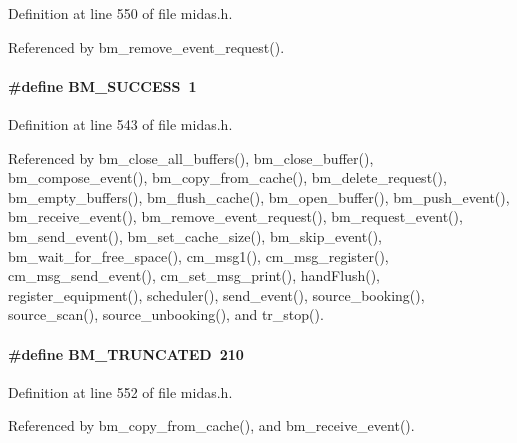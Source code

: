 \begin{DoxyItemize}
\item 
\end{DoxyItemize}

Definition at line 550 of file midas.h.

Referenced by bm\_\-remove\_\-event\_\-request().
\paragraph[{BM\_\-SUCCESS}]{\setlength{\rightskip}{0pt plus 5cm}\#define BM\_\-SUCCESS~1}\hfill\label{group__err22_gadccfb762fd84f9e33940f3d1204042b0}

\begin{DoxyItemize}
\item 
\end{DoxyItemize}

Definition at line 543 of file midas.h.

Referenced by bm\_\-close\_\-all\_\-buffers(), bm\_\-close\_\-buffer(), bm\_\-compose\_\-event(), bm\_\-copy\_\-from\_\-cache(), bm\_\-delete\_\-request(), bm\_\-empty\_\-buffers(), bm\_\-flush\_\-cache(), bm\_\-open\_\-buffer(), bm\_\-push\_\-event(), bm\_\-receive\_\-event(), bm\_\-remove\_\-event\_\-request(), bm\_\-request\_\-event(), bm\_\-send\_\-event(), bm\_\-set\_\-cache\_\-size(), bm\_\-skip\_\-event(), bm\_\-wait\_\-for\_\-free\_\-space(), cm\_\-msg1(), cm\_\-msg\_\-register(), cm\_\-msg\_\-send\_\-event(), cm\_\-set\_\-msg\_\-print(), handFlush(), register\_\-equipment(), scheduler(), send\_\-event(), source\_\-booking(), source\_\-scan(), source\_\-unbooking(), and tr\_\-stop().
\paragraph[{BM\_\-TRUNCATED}]{\setlength{\rightskip}{0pt plus 5cm}\#define BM\_\-TRUNCATED~210}\hfill\label{group__err22_ga21752d578978d7ffe3cdd82e28936667}

\begin{DoxyItemize}
\item 
\end{DoxyItemize}

Definition at line 552 of file midas.h.

Referenced by bm\_\-copy\_\-from\_\-cache(), and bm\_\-receive\_\-event().